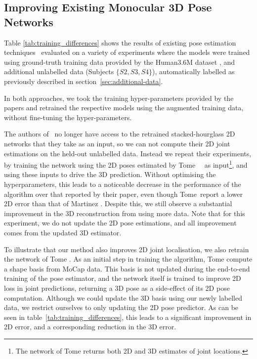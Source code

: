 \documentclass[10pt,twocolumn,letterpaper]{article}
\begin{document}
\subsection{Improving Existing Monocular 3D Pose Networks}
Table \ref{tab:training_differences} shows the results of existing pose
estimation techniques~\cite{tome2017lifting,martinez2017simple} evaluated on a
variety of experiments where the models were trained using ground-truth
training data provided by the Human3.6M dataset \cite{ionescu2014human3}, and
additional unlabelled data (Subjects $\{S2, S3, S4\}$), automatically
labelled as previously described in section~\ref{sec:additional-data}.

In both approaches, we took the training hyper-parameters provided by the papers
and retrained the respective models using the augmented training data, without
fine-tuning the hyper-parameters.

The authors of~\cite{martinez2017simple} no longer have access to the retrained
stacked-hourglass 2D networks that they take as an input, so we can not
compute their 2D joint estimations on the held-out unlabelled data. Instead we
repeat their experiments, by training the network using the 2D poses estimated by
Tome~\etal~\cite{tome2017lifting} as input\footnote{The network of Tome \etal
  \cite{tome2017lifting} returns both 2D and 3D estimates of joint locations.},
and using these inputs to drive the 3D prediction. Without optimising the hyperparameters, this
leads to a noticeable decrease in the performance of the algorithm over that
reported by their paper, even though Tome~\etal report a lower 2D error than
that of  Martinez \etal. Despite this, we still observe a
substantial improvement in the 3D reconstruction from using more data. Note that
for this experiment, we do not update the 2D pose estimations, and all
improvement comes from the updated 3D estimator.

To illustrate that our method also improves  2D joint
localisation, we also retrain the network of Tome \etal. As an initial step in
training the algorithm, Tome \etal  compute a shape basis from MoCap data.
This basis is not updated during the end-to-end training of the pose estimator,
and the network itself is trained to improve 2D loss in joint predictions,
returning a 3D pose as a side-effect of its 2D pose computation. Although we
could update the 3D basis using our newly labelled data, we 
restrict ourselves to only updating the 2D pose predictor. As can be seen in
table~\ref{tab:training_differences}, this leads to a significant improvement in
2D error, and a corresponding reduction in the 3D error.
\end{document}
